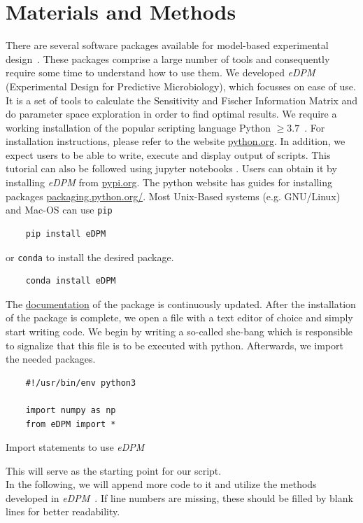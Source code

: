 \documentclass[graybox]{svmult}
\begin{document}
\section*{Materials and Methods}
There are several software packages available for model-based experimental design~\cite{balsa-canto_amigo2_2016, zhang_optimal_2018, busetto_near-optimal_2013}.
These packages comprise a large number of tools and consequently require some time to understand how to use them.
We developed {\it eDPM} (Experimental Design for Predictive Microbiology), which focusses on ease of use.
It is a set of tools to calculate the Sensitivity and Fischer Information Matrix and do parameter space exploration in order to find optimal results.
We require a working installation of the popular scripting language Python $\geq3.7$~\cite{rossumPythonLanguageReference2010}.
For installation instructions, please refer to the website \href{https://www.python.org/downloads/}{python.org}.
In addition, we expect users to be able to write, execute and display output of scripts.
This tutorial can also be followed using jupyter notebooks \cite{jupyterteamJupyterNotebook}.
%
Users can obtain it by installing {\it eDPM} from \href{https://pypi.org/project/edpm/0.0.1/}{pypi.org}.
The python website has guides for installing packages \href{https://packaging.python.org/en/latest/tutorials/installing-packages/}{packaging.python.org/}.
Most Unix-Based systems (e.g. GNU/Linux) and Mac-OS can use \texttt{pip}
\begin{verbatim}
    pip install eDPM
\end{verbatim}
or \texttt{conda} to install the desired package.
\begin{verbatim}
    conda install eDPM
\end{verbatim}
The \href{https://spatial-systems-biology-freiburg.github.io/eDPM/}{documentation} of the package is continuously updated.
After the installation of the package is complete, we open a file with a text editor of choice and simply start writing code.
We begin by writing a so-called she-bang which is responsible to signalize that this file is to be executed with python.
Afterwards, we import the needed packages.
\begin{code}[h]
    \begin{verbatim}
    #!/usr/bin/env python3

    import numpy as np
    from eDPM import *
    \end{verbatim}
    \caption{Import statements to use {\it eDPM}}
    \label{code:import_statements}
\end{code}
This will serve as the starting point for our script.\\
In the following, we will append more code to it and utilize the methods developed in {\it eDPM}~\cite{edpm2023}.
If line numbers are missing, these should be filled by blank lines for better readability.
%
%
\end{document}
